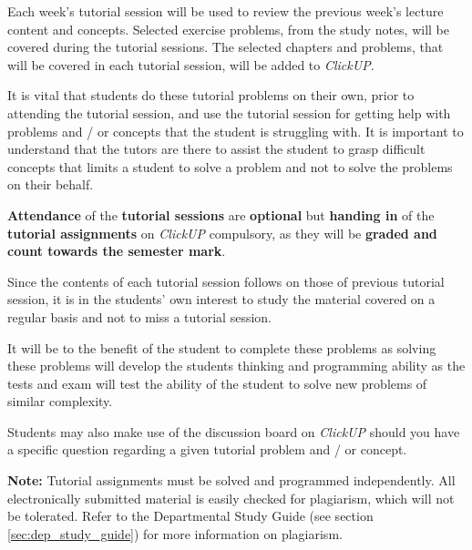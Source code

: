         Each week's tutorial session will be used to review the
        previous week's lecture content and concepts. Selected
        exercise problems, from the study notes, will be covered
        during the tutorial sessions. The selected chapters and
        problems, that will be covered in each tutorial session, will
        be added to {\it ClickUP}.

        It is vital that students do these tutorial problems on their
        own, prior to attending the tutorial session, and use the
        tutorial session for getting help with problems and / or
        concepts that the student is struggling with. It is important
        to understand that the tutors are there to assist the student
        to grasp difficult concepts that limits a student to solve a
        problem and not to solve the problems on their behalf.

        \textbf{Attendance} of the \textbf{tutorial sessions}
        are \textbf{optional} but \textbf{handing in} of the
        \textbf{tutorial assignments} on {\it ClickUP}
          compulsory, as they will be \textbf{graded and count
          towards the semester mark}.

        Since the contents of each tutorial session follows on those
        of previous tutorial session, it is in the students’ own
        interest to study the material covered on a regular basis and
        not to miss a tutorial session.

        It will be to the benefit of the student to complete these
        problems as solving these problems will develop the students
        thinking and programming ability as the tests and exam will
        test the ability of the student to solve new problems of
        similar complexity.

        Students may also make use of the discussion board on {\it
          ClickUP} should you have a specific question regarding a
        given tutorial problem and / or concept.

        \textbf{Note:} Tutorial assignments must be solved and
        programmed independently. All electronically submitted
        material is easily checked for plagiarism, which will not be
        tolerated. Refer to the Departmental Study Guide (see section
        \ref{sec:dep_study_guide}) for more information on plagiarism.
